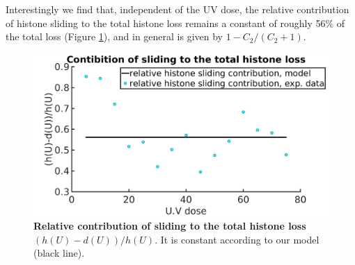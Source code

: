 \documentclass[12pt]{article}
\begin{document}
Interestingly we find that, independent of the UV dose, the relative contribution of histone sliding to the total histone loss remains a constant of roughly 56\% of the total loss (Figure \ref{fig:relativeSlidingContribution}), and in general is given by $1-C_2/(C_2+1)$.

\begin{figure}[H]
\centering
\includegraphics[width=0.5\linewidth, height=0.3\textheight]{relativeSlidingContribution}
\caption{\textbf{Relative contribution of sliding to the total histone loss $(h(U)-d(U))/h(U)$}. It is constant according to our model (black line).}
\label{fig:relativeSlidingContribution}
\end{figure}

\end{document}
